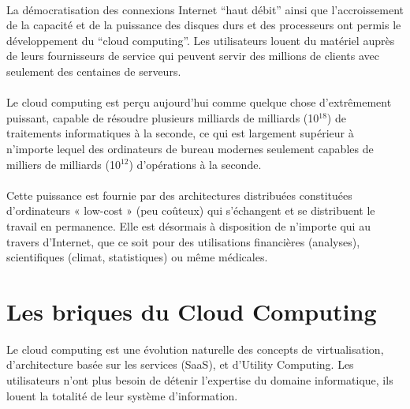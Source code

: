 \documentclass[a4paper,12pt]{report}
\begin{document}
\begin{onehalfspace}
	\paragraph*{}
	La démocratisation des connexions Internet “haut débit” ainsi que l'accroissement de la capacité et de la puissance des disques durs et des processeurs ont permis le développement du “cloud computing”. Les utilisateurs louent du matériel auprès de leurs fournisseurs de service qui peuvent servir des millions de clients avec seulement des centaines de serveurs.
	
	\paragraph*{}
	Le cloud computing est perçu aujourd'hui comme quelque chose d'extrêmement puissant, capable de résoudre plusieurs milliards de milliards (10$^{18}$) de traitements informatiques à la seconde, ce qui est largement supérieur à n'importe lequel des ordinateurs de bureau modernes seulement capables de milliers de milliards (10$^{12}$) d'opérations à la seconde.
	
	\paragraph*{}
	Cette puissance est fournie par des architectures distribuées constituées d'ordinateurs « low-cost » (peu coûteux) qui s'échangent et se distribuent le travail en permanence. Elle est désormais à disposition de n'importe qui au travers d'Internet, que ce soit pour des utilisations financières (analyses), scientifiques (climat, statistiques) ou même médicales.
	

	\section{Les briques du Cloud Computing}

	Le cloud computing est une évolution naturelle des concepts de virtualisation, d’architecture basée sur les services (SaaS), et d’Utility Computing. Les utilisateurs n’ont plus besoin de détenir l’expertise du domaine informatique, ils louent la totalité de leur système d’information.
	

\end{onehalfspace}
\end{document}
